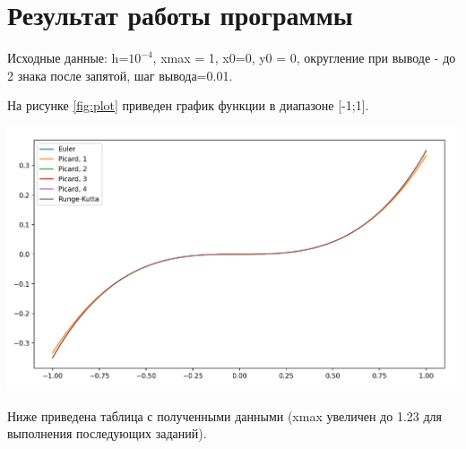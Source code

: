 \documentclass[12pt]{report}
\begin{document}
\chapter{Результат работы программы}

Исходные данные: h=$10^{-4}$, xmax = 1, x0=0, y0 = 0, округление при выводе - до 2 знака после запятой, шаг вывода=0.01.


На рисунке \ref{fig:plot} приведен график функции в диапазоне [-1;1].

\includegraphics[scale=0.7]{img/plot}\label{fig:plot}

Ниже приведена таблица с полученными данными (xmax увеличен до 1.23 для выполнения последующих заданий).
\end{document}
